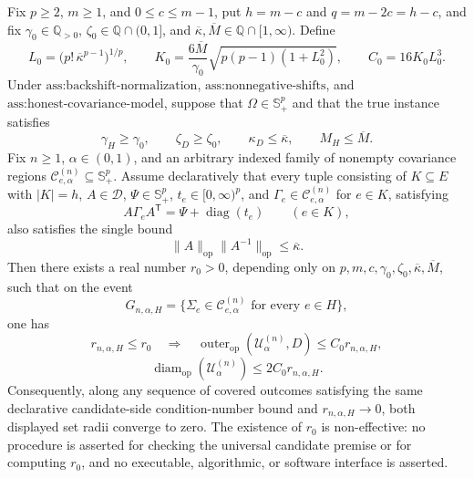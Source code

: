 Fix \(p\geq2\), \(m\geq1\), and \(0\leq c\leq m-1\), put \(h=m-c\) and \(q=m-2c=h-c\), and fix \(\gamma_0\in\mathbb Q_{>0}\), \(\zeta_0\in\mathbb Q\cap(0,1]\), and \(\overline\kappa,\overline M\in\mathbb Q\cap[1,\infty)\). Define
\[
L_0=\bigl(p!\,\overline\kappa^{p-1}\bigr)^{1/p},
\qquad
K_0=\frac{6\overline M}{\gamma_0}
\sqrt{p(p-1)(1+L_0^2)},
\qquad
C_0=16K_0L_0^3.
\]
Under \(\text{ass:backshift-normalization}\), \(\text{ass:nonnegative-shifts}\), and \(\text{ass:honest-covariance-model}\), suppose that \(\Omega\in\mathbb S_+^p\) and that the true instance satisfies
\[
\gamma_H\geq\gamma_0,\qquad
\zeta_D\geq\zeta_0,\qquad
\kappa_D\leq\overline\kappa,\qquad
M_H\leq\overline M.
\]
Fix \(n\geq1\), \(\alpha\in(0,1)\), and an arbitrary indexed family of nonempty covariance regions \(\mathcal C^{(n)}_{e,\alpha}\subseteq\mathbb S_{+}^p\). Assume declaratively that every tuple consisting of \(K\subseteq E\) with \(|K|=h\), \(A\in\mathcal D\), \(\Psi\in\mathbb S_+^p\), \(t_e\in[0,\infty)^p\), and \(\Gamma_e\in\mathcal C^{(n)}_{e,\alpha}\) for \(e\in K\), satisfying
\[
A\Gamma_eA^{\mathsf T}=\Psi+\operatorname{diag}(t_e)
\qquad(e\in K),
\]
also satisfies the single bound
\[
\|A\|_{\mathrm{op}}\|A^{-1}\|_{\mathrm{op}}
\leq\overline\kappa.
\]
Then there exists a real number \(r_0>0\), depending only on \(p,m,c,\gamma_0,\zeta_0,\overline\kappa,\overline M\), such that on the event
\[
G_{n,\alpha,H}
=\{\Sigma_e\in\mathcal C^{(n)}_{e,\alpha}\text{ for every }e\in H\},
\]
one has
\[
r_{n,\alpha,H}\leq r_0
\quad\Longrightarrow\quad
\operatorname{outer}_{\mathrm{op}}(\mathcal U^{(n)}_\alpha,D)
\leq C_0r_{n,\alpha,H},
\]
\[
\operatorname{diam}_{\mathrm{op}}(\mathcal U^{(n)}_\alpha)
\leq2C_0r_{n,\alpha,H}.
\]
Consequently, along any sequence of covered outcomes satisfying the same declarative candidate-side condition-number bound and \(r_{n,\alpha,H}\to0\), both displayed set radii converge to zero. The existence of \(r_0\) is non-effective: no procedure is asserted for checking the universal candidate premise or for computing \(r_0\), and no executable, algorithmic, or software interface is asserted.